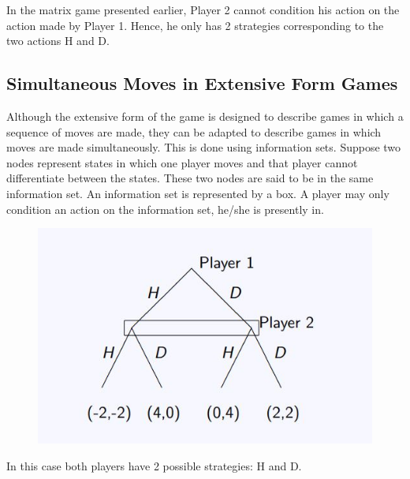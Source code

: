 \documentclass[]{report}
\begin{document}
In the matrix game presented earlier, Player 2 cannot condition his
action on the action made by Player 1. Hence, he only has 2
strategies corresponding to the two actions H and D.

\subsection{Simultaneous Moves in Extensive Form Games}
Although the extensive form of the game is designed to describe
games in which a sequence of moves are made, they can be
adapted to describe games in which moves are made
simultaneously.
This is done using information sets. Suppose two nodes represent
states in which one player moves and that player cannot
differentiate between the states.
These two nodes are said to be in the same information set. An
information set is represented by a box.
A player may only condition an action on the information set,
he/she is presently in.



\begin{figure}[h!]
\centering
\includegraphics[width=0.7\linewidth]{images/DR5-Slide15}
\caption{}
\label{fig:DR5-Slide15}
\end{figure}
In this case both players have 2 possible strategies: H and D.

\end{document}
